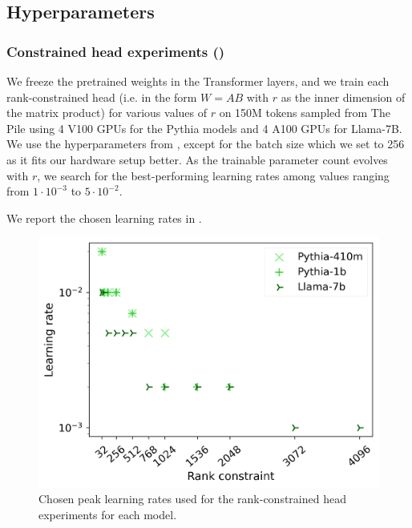 
\subsection{Hyperparameters}
\label{app:hyperparams}

\subsubsection{Constrained head experiments ()}

We freeze the pretrained weights in the Transformer layers, and we train each rank-constrained head (i.e. in the form $W=AB$ with $r$ as the inner dimension of the matrix product) for various values of $r$ on 150M tokens sampled from The Pile using 4 V100 GPUs for the Pythia models and 4 A100 GPUs for Llama-7B. We use the hyperparameters from \citet{biderman2023pythia}, except for the batch size which we set to 256 as it fits our hardware setup better. As the trainable parameter count evolves with $r$, we search for the best-performing learning rates among values ranging from $1\cdot 10^{-3}$ to $5\cdot 10^{-2}$.

We report the chosen learning rates in .

\begin{figure}[h]
\centering
    \includegraphics[width=0.6\linewidth]{sources/part_1/softmax_bottleneck/imgs/lr_final.png}
    \caption{Chosen peak learning rates used for the rank-constrained head experiments for each model.}
    \label{fig:lr_choices}
\end{figure}


